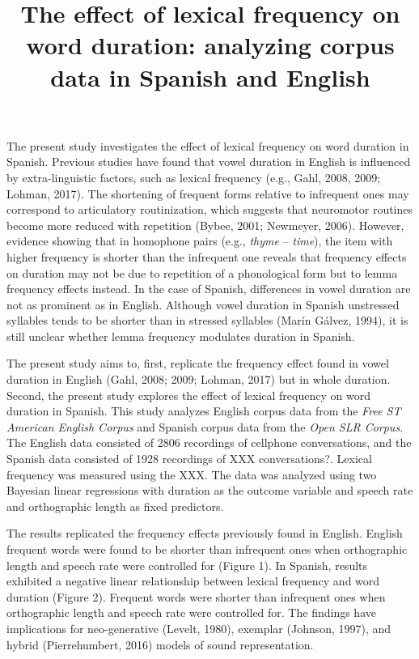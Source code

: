 \documentclass[
  12pt,
]{article}
\title{The effect of lexical frequency on word duration: analyzing
corpus data in Spanish and English}
\author{}
\date{\vspace{-2.5em}}
\begin{document}
\maketitle

The present study investigates the effect of lexical frequency on word
duration in Spanish. Previous studies have found that vowel duration in
English is influenced by extra-linguistic factors, such as lexical
frequency (e.g., Gahl, 2008, 2009; Lohman, 2017). The shortening of
frequent forms relative to infrequent ones may correspond to
articulatory routinization, which suggests that neuromotor routines
become more reduced with repetition (Bybee, 2001; Newmeyer, 2006).
However, evidence showing that in homophone pairs (e.g., \emph{thyme} --
\emph{time}), the item with higher frequency is shorter than the
infrequent one reveals that frequency effects on duration may not be due
to repetition of a phonological form but to lemma frequency effects
instead. In the case of Spanish, differences in vowel duration are not
as prominent as in English. Although vowel duration in Spanish
unstressed syllables tends to be shorter than in stressed syllables
(Marín Gálvez, 1994), it is still unclear whether lemma frequency
modulates duration in Spanish.

The present study aims to, first, replicate the frequency effect found
in vowel duration in English (Gahl, 2008; 2009; Lohman, 2017) but in
whole duration. Second, the present study explores the effect of lexical
frequency on word duration in Spanish. This study analyzes English
corpus data from the \emph{Free ST American English Corpus} and Spanish
corpus data from the \emph{Open SLR Corpus}. The English data consisted
of 2806 recordings of cellphone conversations, and the Spanish data
consisted of 1928 recordings of XXX conversations?. Lexical frequency
was measured using the XXX. The data was analyzed using two Bayesian
linear regressions with duration as the outcome variable and speech rate
and orthographic length as fixed predictors.

The results replicated the frequency effects previously found in
English. English frequent words were found to be shorter than infrequent
ones when orthographic length and speech rate were controlled for
(Figure 1). In Spanish, results exhibited a negative linear relationship
between lexical frequency and word duration (Figure 2). Frequent words
were shorter than infrequent ones when orthographic length and speech
rate were controlled for. The findings have implications for
neo-generative (Levelt, 1980), exemplar (Johnson, 1997), and hybrid
(Pierrehumbert, 2016) models of sound representation.
\end{document}
